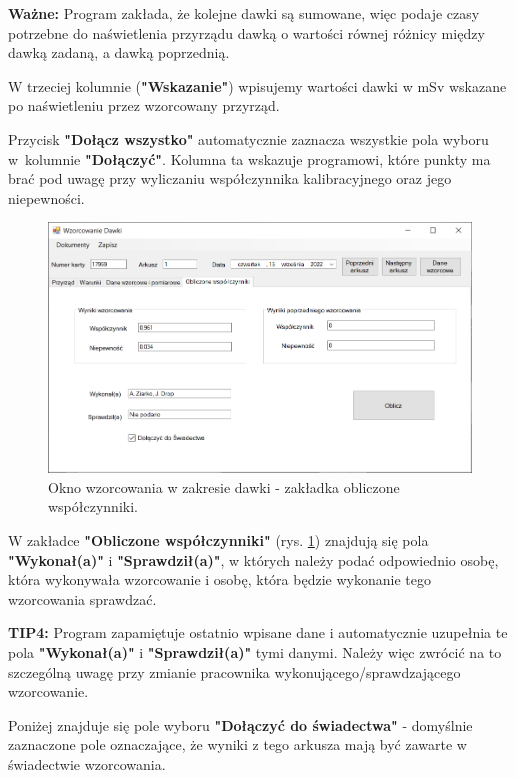 \textbf{Ważne:} Program zakłada, że kolejne dawki są sumowane, więc podaje czasy potrzebne do naświetlenia przyrządu dawką o wartości równej różnicy między dawką zadaną, a dawką poprzednią.

W trzeciej kolumnie (\textbf{"Wskazanie"}) wpisujemy wartości dawki w mSv wskazane po naświetleniu przez wzorcowany przyrząd.

Przycisk \textbf{"Dołącz wszystko"} automatycznie zaznacza wszystkie pola wyboru w~kolumnie \textbf{"Dołączyć"}. Kolumna ta wskazuje programowi, które punkty ma brać pod uwagę przy wyliczaniu współczynnika kalibracyjnego oraz jego niepewności.

\begin{figure}[htb]
	\centering
	\includegraphics[width=\columnwidth]{obrazki/Wzorcowanie/dawka/wspolczynniki.png}
	\caption{Okno wzorcowania w zakresie dawki - zakładka obliczone współczynniki.}
	\label{dawkaWspolczynniki}
\end{figure}

W zakładce \textbf{"Obliczone współczynniki"} (rys. \ref{dawkaWspolczynniki}) znajdują się pola \textbf{"Wykonał(a)"} i \textbf{"Sprawdził(a)"}, w których należy podać odpowiednio osobę, która wykonywała wzorcowanie i osobę, która będzie wykonanie tego wzorcowania sprawdzać. 

\textbf{TIP4:} Program zapamiętuje ostatnio wpisane dane i automatycznie uzupełnia te pola \textbf{"Wykonał(a)"} i \textbf{"Sprawdził(a)"} tymi danymi. Należy więc zwrócić na to szczególną uwagę przy zmianie pracownika wykonującego/sprawdzającego wzorcowanie.

Poniżej znajduje się pole wyboru \textbf{"Dołączyć do świadectwa"} - domyślnie zaznaczone pole oznaczające, że wyniki z tego arkusza mają być zawarte w świadectwie wzorcowania.

